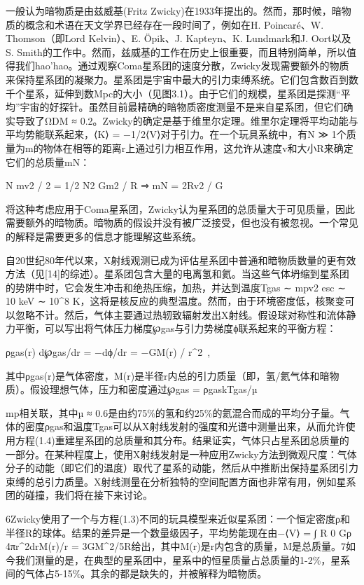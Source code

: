 

一般认为暗物质是由兹威基(Fritz Zwicky)在1933年提出的。然而，那时候，暗物质的概念和术语在天文学界已经存在一段时间了，例如在H. Poincaré、W. Thomson（即Lord Kelvin）、E. Öpik、J. Kapteyn、K. Lundmark和J. Oort以及S. Smith的工作中。然而，兹威基的工作在历史上很重要，而且特别简单，所以值得我们hao'hao。通过观察Coma星系团的速度分散，Zwicky发现需要额外的物质来保持星系团的凝聚力。星系团是宇宙中最大的引力束缚系统。它们包含数百到数千个星系，延伸到数Mpc的大小（见图3.1）。由于它们的规模，星系团是探测“平均”宇宙的好探针。虽然目前最精确的暗物质密度测量不是来自星系团，但它们确实导致了ΩDM ≈ 0.2。Zwicky的确定是基于维里尔定理。维里尔定理将平均动能与平均势能联系起来，⟨K⟩ = −1/2⟨V⟩对于引力。在一个玩具系统中，有N ≫ 1个质量为m的物体在相等的距离r上通过引力相互作用，这允许从速度v和大小R来确定它们的总质量mN：

N mv2 / 2 = 1/2 N2 Gm2 / R ⇒ mN = 2Rv2 / G  

将这种考虑应用于Coma星系团，Zwicky认为星系团的总质量大于可见质量，因此需要额外的暗物质。暗物质的假设并没有被广泛接受，但也没有被忽视。一个常见的解释是需要更多的信息才能理解这些系统。

自20世纪80年代以来，X射线观测已成为评估星系团中普通和暗物质数量的更有效方法（见[14]的综述）。星系团包含大量的电离氢和氦。当这些气体坍缩到星系团的势阱中时，它会发生冲击和绝热压缩，加热，并达到温度Tgas ∼ mpv2 esc ∼ 10 keV ∼ 10^8 K，这将是核反应的典型温度。然而，由于环境密度低，核聚变可以忽略不计。然后，气体主要通过热轫致辐射发出X射线。假设球对称性和流体静力平衡，可以写出将气体压力梯度℘gas与引力势梯度ϕ联系起来的平衡方程：

ρgas(r) d℘gas/dr = −dϕ/dr = −GM(r) / r^2~,  

其中ρgas(r)是气体密度，M(r)是半径r内总的引力质量（即，氢/氦气体和暗物质）。假设理想气体，压力和密度通过℘gas = ρgaskTgas/µ

mp相关联，其中µ ≈ 0.6是由约75\%的氢和约25\%的氦混合而成的平均分子量。气体的密度ρgas和温度Tgas可以从X射线发射的强度和光谱中测量出来，从而允许使用方程(1.4)重建星系团的总质量和其分布。结果证实，气体只占星系团总质量的一部分。在某种程度上，使用X射线发射是一种应用Zwicky方法到微观尺度：气体分子的动能（即它们的温度）取代了星系的动能，然后从中推断出保持星系团引力束缚的总引力质量。X射线测量在分析独特的空间配置方面也非常有用，例如星系团的碰撞，我们将在接下来讨论。

6Zwicky使用了一个与方程(1.3)不同的玩具模型来近似星系团：一个恒定密度ρ和半径R的球体。结果的差异是一个数量级因子，平均势能现在由−⟨V⟩ = ∫ R 0 Gρ 4πr^2drM(r)/r = 3GM^2/5R给出，其中M(r)是r内包含的质量，M是总质量。7如今我们测量的是，在典型的星系团中，星系中的恒星质量占总质量的1-2\%，星系间的气体占5-15\%。其余的都是缺失的，并被解释为暗物质。